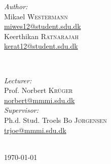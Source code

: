 \documentclass[11pt]{article}
\begin{document}
\begin{titlepage}
\begin{minipage}{0.4\textwidth}
\begin{flushleft} \large
\emph{Author:}\\
Mikael \textsc{Westermann}\\
\url{miwes12@student.sdu.dk}\\
Keerthikan \textsc{Ratnarajah}\\ %
\url{kerat12@student.sdu.dk}
\end{flushleft}
\end{minipage}
~
\begin{minipage}{0.4\textwidth}
\begin{flushright} \large
\emph{Lecturer:} \\
Prof. Norbert \textsc{Krüger}\\ %
\url{norbert@mmmi.sdu.dk}\\
\emph{Supervisor:} \\
Ph.d. Stud. Troels Bo \textsc{Jørgensen}\\
\url{trjoe@mmmi.sdu.dk}
\end{flushright}
\end{minipage}\\[4cm]



{\large \today}\\[3cm] %


 

\vfill %

\end{titlepage}
\tableofcontents
\newpage
\listoffigures
\newpage

%
%
%
%




\end{document}
